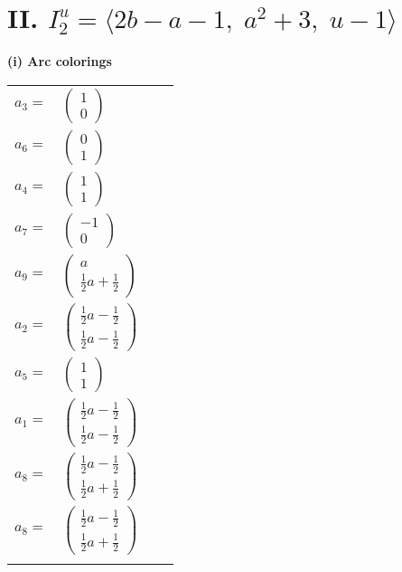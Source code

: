 \documentclass[1p]{elsarticle_modified}
\theoremstyle{definition}
\begin{document}
\centering \section*{II. $I^u_{2}= \langle 2 b- a-1,\;a^2+3,\;u-1 \rangle$}
\flushleft \textbf{(i) Arc colorings}\\
\begin{tabular}{m{7pt} m{180pt} m{7pt} m{180pt} }
\flushright $a_{3}=$&$\begin{pmatrix}1\\0\end{pmatrix}$ \\
\flushright $a_{6}=$&$\begin{pmatrix}0\\1\end{pmatrix}$ \\
\flushright $a_{4}=$&$\begin{pmatrix}1\\1\end{pmatrix}$ \\
\flushright $a_{7}=$&$\begin{pmatrix}-1\\0\end{pmatrix}$ \\
\flushright $a_{9}=$&$\begin{pmatrix}a\\\frac{1}{2} a+\frac{1}{2}\end{pmatrix}$ \\
\flushright $a_{2}=$&$\begin{pmatrix}\frac{1}{2} a-\frac{1}{2}\\\frac{1}{2} a-\frac{1}{2}\end{pmatrix}$ \\
\flushright $a_{5}=$&$\begin{pmatrix}1\\1\end{pmatrix}$ \\
\flushright $a_{1}=$&$\begin{pmatrix}\frac{1}{2} a-\frac{1}{2}\\\frac{1}{2} a-\frac{1}{2}\end{pmatrix}$ \\
\flushright $a_{8}=$&$\begin{pmatrix}\frac{1}{2} a-\frac{1}{2}\\\frac{1}{2} a+\frac{1}{2}\end{pmatrix}$\\ \flushright $a_{8}=$&$\begin{pmatrix}\frac{1}{2} a-\frac{1}{2}\\\frac{1}{2} a+\frac{1}{2}\end{pmatrix}$\\&\end{tabular}
\end{document}
